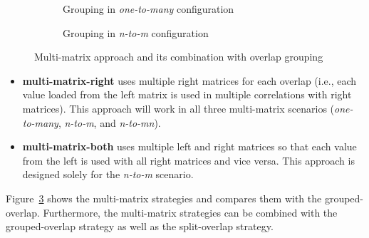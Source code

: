 \begin{figure}[ht]
	\centering	
	\begin{subfigure}{0.42\textwidth}
		\centering
		\def\svgwidth{\textwidth}
		\fontsize{7}{9}\selectfont
		
		\caption{Grouping in \textit{one-to-many} configuration}
		\label{fig:job_size_modifiers_n_to_mn}
	\end{subfigure}
	\hfill
	\begin{subfigure}{0.42\textwidth}
		\centering
		\def\svgwidth{\textwidth}
		\fontsize{7}{9}\selectfont
		
		\caption{Grouping in \textit{n-to-m} configuration}
		\label{fig:job_size_modifiers_n_to_m}
	\end{subfigure}
	
	\caption{Multi-matrix approach and its combination with overlap grouping}
	\label{fig:job_size_modifiers}
\end{figure}

\begin{itemize}
	\item \textbf{multi-matrix-right} uses multiple right matrices for each overlap (i.e., each value loaded from the left matrix is used in multiple correlations with right matrices). This approach will work in all three multi-matrix scenarios (\textit{one-to-many}, \textit{n-to-m}, and \textit{n-to-mn}).
	\item \textbf{multi-matrix-both} uses multiple left and right matrices so that each value from the left is used with all right matrices and vice versa. This approach is designed solely for the \textit{n-to-m} scenario.
\end{itemize}

Figure~\ref{fig:job_size_modifiers} shows the multi-matrix strategies and compares them with the grouped-overlap. Furthermore, the multi-matrix strategies can be combined with the grouped-overlap strategy as well as the split-overlap strategy.
